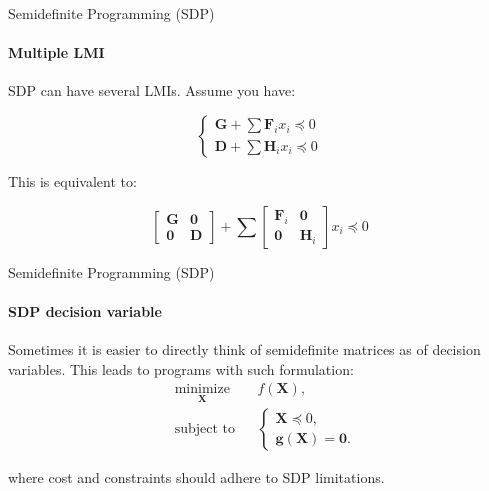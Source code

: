 \documentclass{beamer}
\begin{document}
\begin{frame}{Semidefinite Programming (SDP)}
\framesubtitle{Multiple LMI}
\begin{flushleft}

SDP can have several LMIs. Assume you have:

\begin{equation}
    \begin{cases}
        \mathbf{G} + \sum \mathbf{F}_i x_i \preceq 0 \\
        \mathbf{D} + \sum \mathbf{H}_i x_i \preceq 0
    \end{cases}
\end{equation}


This is equivalent to:

\begin{equation}
    \begin{bmatrix} 
            \mathbf{G} & \mathbf{0} \\
            \mathbf{0} & \mathbf{D}
    \end{bmatrix} +
    \sum
    \begin{bmatrix} 
            \mathbf{F}_i & \mathbf{0} \\
            \mathbf{0}   & \mathbf{H}_i
    \end{bmatrix}
    x_i \preceq 0
\end{equation}

\end{flushleft}
\end{frame}




\begin{frame}{Semidefinite Programming (SDP)}
\framesubtitle{SDP decision variable}
\begin{flushleft}

Sometimes it is easier to directly think of semidefinite matrices as of decision variables. This leads to programs with such formulation:
%
\begin{equation}
\begin{aligned}
& \underset{\mathbf{X}}{\text{minimize}}
& & f(\mathbf{X}), \\
& \text{subject to}
& & \begin{cases}
    \mathbf{X} \preceq 0, \\
    \mathbf{g}(\mathbf{X}) = \mathbf{0}.
    \end{cases}
\end{aligned}
\end{equation}

where cost and constraints should adhere to SDP limitations.

\end{flushleft}
\end{frame}
\end{document}
